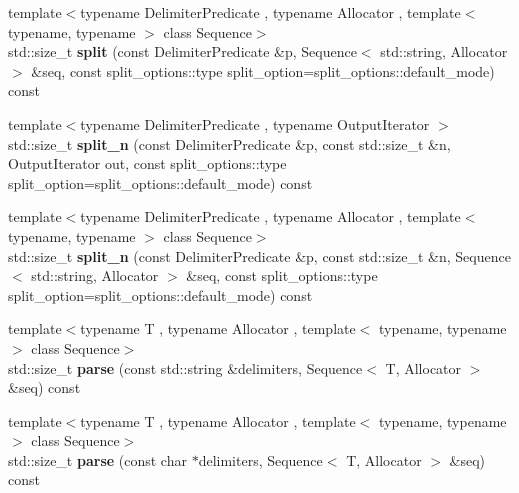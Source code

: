 \begin{DoxyCompactItemize}
\item 
\hypertarget{classstrtk_1_1ext__string_a5bbc5261cb10147acda8925430719cee}{{\footnotesize template$<$typename Delimiter\-Predicate , typename Allocator , template$<$ typename, typename $>$ class Sequence$>$ }\\std\-::size\-\_\-t {\bfseries split} (const Delimiter\-Predicate \&p, Sequence$<$ std\-::string, Allocator $>$ \&seq, const split\-\_\-options\-::type split\-\_\-option=split\-\_\-options\-::default\-\_\-mode) const }\label{classstrtk_1_1ext__string_a5bbc5261cb10147acda8925430719cee}

\item 
\hypertarget{classstrtk_1_1ext__string_abdfd7eaef30588874a8e9be2248ec462}{{\footnotesize template$<$typename Delimiter\-Predicate , typename Output\-Iterator $>$ }\\std\-::size\-\_\-t {\bfseries split\-\_\-n} (const Delimiter\-Predicate \&p, const std\-::size\-\_\-t \&n, Output\-Iterator out, const split\-\_\-options\-::type split\-\_\-option=split\-\_\-options\-::default\-\_\-mode) const }\label{classstrtk_1_1ext__string_abdfd7eaef30588874a8e9be2248ec462}

\item 
\hypertarget{classstrtk_1_1ext__string_aaec150c9d2dfdc87d02d40857df6c4a5}{{\footnotesize template$<$typename Delimiter\-Predicate , typename Allocator , template$<$ typename, typename $>$ class Sequence$>$ }\\std\-::size\-\_\-t {\bfseries split\-\_\-n} (const Delimiter\-Predicate \&p, const std\-::size\-\_\-t \&n, Sequence$<$ std\-::string, Allocator $>$ \&seq, const split\-\_\-options\-::type split\-\_\-option=split\-\_\-options\-::default\-\_\-mode) const }\label{classstrtk_1_1ext__string_aaec150c9d2dfdc87d02d40857df6c4a5}

\item 
\hypertarget{classstrtk_1_1ext__string_a5fa9c21c7ecd64b4b3da5c3396af0b51}{{\footnotesize template$<$typename T , typename Allocator , template$<$ typename, typename $>$ class Sequence$>$ }\\std\-::size\-\_\-t {\bfseries parse} (const std\-::string \&delimiters, Sequence$<$ T, Allocator $>$ \&seq) const }\label{classstrtk_1_1ext__string_a5fa9c21c7ecd64b4b3da5c3396af0b51}

\item 
\hypertarget{classstrtk_1_1ext__string_ab017dc85c08135189d1a40240bb022b4}{{\footnotesize template$<$typename T , typename Allocator , template$<$ typename, typename $>$ class Sequence$>$ }\\std\-::size\-\_\-t {\bfseries parse} (const char $\ast$delimiters, Sequence$<$ T, Allocator $>$ \&seq) const }\label{classstrtk_1_1ext__string_ab017dc85c08135189d1a40240bb022b4}

\end{DoxyCompactItemize}
